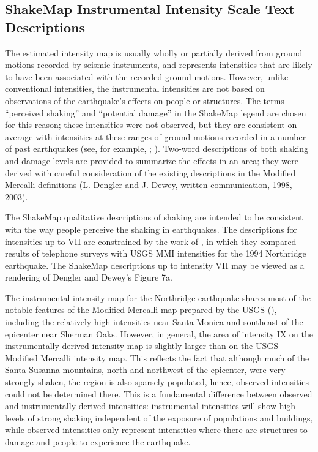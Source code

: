 \documentclass[letterpaper,10pt,english]{sphinxmanual}
\begin{document}
\subsection{ShakeMap Instrumental Intensity Scale Text Descriptions}
\label{tg_intensity:shakemap-instrumental-intensity-scale-text-descriptions}
The estimated intensity map is usually wholly or partially derived from ground motions
recorded by seismic instruments, and represents intensities that are likely to have been
associated with the recorded ground motions. However, unlike conventional intensities,
the instrumental intensities are not based on observations of the earthquake’s effects on
people or structures. The terms ``perceived shaking'' and ``potential damage'' in the
ShakeMap legend are chosen for this reason; these intensities were not observed, but they
are consistent on average with intensities at these ranges of ground motions recorded in a
number of past earthquakes (see, for example, {\hyperref[references:wald1999b]{}}; {\hyperref[references:worden2012]{}}).
Two-word descriptions of both shaking and damage levels are provided to summarize the
effects in an area; they were derived with careful consideration of the existing
descriptions in the Modified Mercalli definitions (L. Dengler and J. Dewey, written
communication, 1998, 2003).

The ShakeMap qualitative descriptions of shaking are intended to be consistent with the way
people perceive the shaking in earthquakes.  The descriptions for intensities up to VII are
constrained by the work of {\hyperref[references:dengler1998]{}}, in which they compared results of
telephone surveys with USGS MMI intensities for the 1994 Northridge earthquake. The
ShakeMap descriptions up to intensity VII may be viewed as a rendering of Dengler and
Dewey's Figure 7a.

The instrumental intensity map for the Northridge earthquake shares most of the notable
features of the Modified Mercalli map prepared by the USGS ({\hyperref[references:dewey1995]{}}),
including the relatively high intensities near Santa Monica and southeast of the epicenter
near Sherman Oaks.  However, in general, the area of intensity IX on the instrumentally
derived intensity map is slightly larger than on the USGS Modified Mercalli intensity
map. This reflects the fact that although much of the Santa Susanna mountains, north and
northwest of the epicenter, were very strongly shaken, the region is also sparsely
populated, hence, observed intensities could not be determined there.  This is a fundamental
difference between observed and instrumentally derived intensities: instrumental
intensities will show high levels of strong shaking independent of the exposure of
populations and buildings, while observed intensities only represent intensities where there are
structures to damage and people to experience the earthquake.
\end{document}
